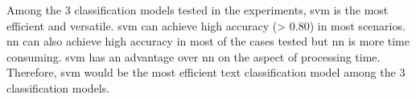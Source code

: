 Among the 3 classification models tested in the experiments, \ac{svm} is the most efficient and versatile. \Ac{svm} can achieve high accuracy (> 0.80) in most scenarios. \Ac{nn} can also achieve high accuracy in most of the cases tested but \ac{nn} is more time consuming. \Ac{svm} has an advantage over \ac{nn} on the aspect of processing time. Therefore, \ac{svm} would be the most efficient text classification model among the 3 classification models.

